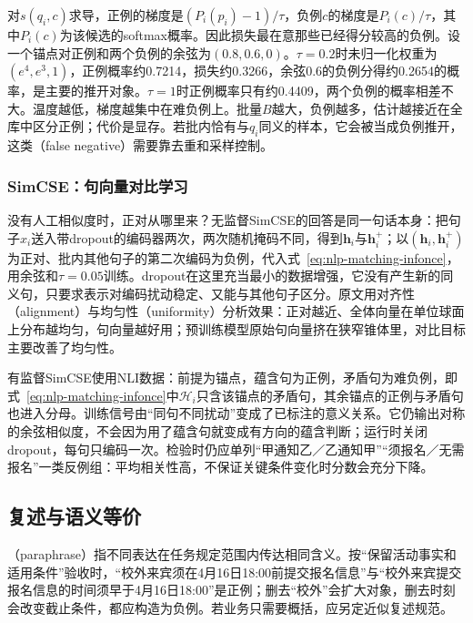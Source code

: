 对$s(q_i,c)$求导，正例的梯度是$(P_i(p_i)-1)/\tau$，负例$c$的梯度是$P_i(c)/\tau$，其中$P_i(c)$为该候选的softmax概率。因此损失最在意那些已经得分较高的负例。设一个锚点对正例和两个负例的余弦为$(0.8,0.6,0)$。$\tau=0.2$时未归一化权重为$(e^4,e^3,1)$，正例概率约0.7214，损失约0.3266，余弦0.6的负例分得约0.2654的概率，是主要的推开对象。$\tau=1$时正例概率只有约0.4409，两个负例的概率相差不大。温度越低，梯度越集中在难负例上。批量$B$越大，负例越多，估计越接近在全库中区分正例；代价是显存。若批内恰有与$q_i$同义的样本，它会被当成负例推开，这类（false negative）需要靠去重和采样控制。

\subsubsection{SimCSE：句向量对比学习}
\label{sec:nlp-classification-simcse}

没有人工相似度时，正对从哪里来？无监督SimCSE的回答是同一句话本身：把句子$x_i$送入带dropout的编码器两次，两次随机掩码不同，得到$\bm h_i$与$\bm h_i^+$；以$(\bm h_i,\bm h_i^+)$为正对、批内其他句子的第二次编码为负例，代入式~\eqref{eq:nlp-matching-infonce}，用余弦和$\tau=0.05$训练。dropout在这里充当最小的数据增强，它没有产生新的同义句，只要求表示对编码扰动稳定、又能与其他句子区分。原文用对齐性（alignment）与均匀性（uniformity）分析效果：正对越近、全体向量在单位球面上分布越均匀，句向量越好用；预训练模型原始句向量挤在狭窄锥体里，对比目标主要改善了均匀性。

有监督SimCSE使用NLI数据：前提为锚点，蕴含句为正例，矛盾句为难负例，即式~\eqref{eq:nlp-matching-infonce}中$\mathcal H_i$只含该锚点的矛盾句，其余锚点的正例与矛盾句也进入分母。训练信号由“同句不同扰动”变成了已标注的意义关系。它仍输出对称的余弦相似度，不会因为用了蕴含句就变成有方向的蕴含判断；运行时关闭dropout，每句只编码一次。检验时仍应单列“甲通知乙／乙通知甲”“须报名／无需报名”一类反例组：平均相关性高，不保证关键条件变化时分数会充分下降。

\subsection{复述与语义等价}
\label{sec:nlp-classification-paraphrase}

（paraphrase）指不同表达在任务规定范围内传达相同含义。按“保留活动事实和适用条件”验收时，“校外来宾须在4月16日18:00前提交报名信息”与“校外来宾提交报名信息的时间须早于4月16日18:00”是正例；删去“校外”会扩大对象，删去时刻会改变截止条件，都应构造为负例。若业务只需要概括，应另定近似复述规范。


